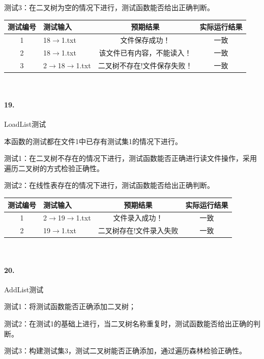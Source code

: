 \documentclass[supercite]{Experimental_Report}
\theoremstyle{definition}
\begin{document}
测试3：在二叉树为空的情况下进行，测试函数能否给出正确判断。

\vspace{0.5em}

\begin{tabular}{|c|p{2.7cm}|c|c|}
	\hline
	测试编号 & 测试输入 & 预期结果 & 实际运行结果 \\
	\hline
	1 & 18$\rightarrow$1.txt & 文件保存成功！ & 一致 \\
	\hline
	2 & 18$\rightarrow$1.txt & 该文件已有内容，不能读入！ & 一致 \\
	\hline
	3 & 2$\rightarrow$18$\rightarrow$1.txt & 二叉树不存在!文件保存失败！ & 一致 \\
	\hline
\end{tabular}

~\

\paragraph{19.}LoadList测试
	
本函数的测试都在文件1中已存有测试集1的情况下进行。

测试1：在二叉树不存在的情况下进行，测试函数能否正确进行读文件操作，采用遍历二叉树的方式检验正确性。

测试2：在线性表存在的情况下进行，测试函数能否给出正确判断。

\vspace{0.5em}

\begin{tabular}{|c|p{2.7cm}|c|c|}
	\hline
	测试编号 & 测试输入 & 预期结果 & 实际运行结果 \\
	\hline
	1 & 2$\rightarrow$19$\rightarrow$1.txt & 文件录入成功！ & 一致 \\
	\hline
	2 & 19$\rightarrow$1.txt & 二叉树存在!文件录入失败 & 一致 \\
	\hline
\end{tabular}

~\

\paragraph{20.}AddList测试

测试1：将测试函数能否正确添加二叉树；

测试2：在测试1的基础上进行，当二叉树名称重复时，测试函数能否给出正确的判断。

测试3：构建测试集3，测试二叉树能否正确添加，通过遍历森林检验正确性。

\vspace{0.5em}
\end{document}
